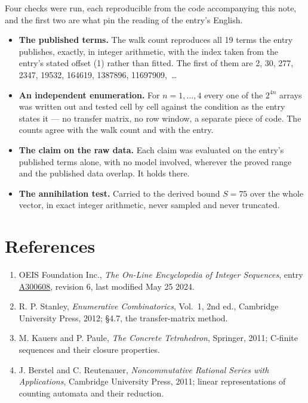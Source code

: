 \documentclass[11pt]{article}
\theoremstyle{definition}
\begin{document}
Four checks were run, each reproducible from the code accompanying this note, and the first two are what pin the reading of the entry's English.

\begin{itemize}

\item {\bfseries The published terms.} The walk count reproduces all 19 terms the entry publishes, exactly, in integer arithmetic, with the index taken from the entry's stated offset (1) rather than fitted. The first of them are 2, 30, 277, 2347, 19532, 164619, 1387896, 11697909,~\dots

\item {\bfseries An independent enumeration.} For $n = 1,\dots,4$ every one of the $2^{4n}$ arrays was written out and tested cell by cell against the condition as the entry states it --- no transfer matrix, no row window, a separate piece of code. The counts agree with the walk count and with the entry.

\item {\bfseries The claim on the raw data.} Each claim was evaluated on the entry's published terms alone, with no model involved, wherever the proved range and the published data overlap. It holds there.

\item {\bfseries The annihilation test.} Carried to the derived bound $S = 75$ over the whole vector, in exact integer arithmetic, never sampled and never truncated.

\end{itemize}

\section{References}

\begin{enumerate}

\item OEIS Foundation Inc., \emph{The On-Line Encyclopedia of Integer Sequences}, entry \href{https://oeis.org/A300608}{A300608}, revision 6, last modified May 25 2024.

\item R. P. Stanley, \emph{Enumerative Combinatorics}, Vol.~1, 2nd ed., Cambridge University Press, 2012; \S4.7, the transfer-matrix method.

\item M. Kauers and P. Paule, \emph{The Concrete Tetrahedron}, Springer, 2011; C-finite sequences and their closure properties.

\item J. Berstel and C. Reutenauer, \emph{Noncommutative Rational Series with Applications}, Cambridge University Press, 2011; linear representations of counting automata and their reduction.

\end{enumerate}
\end{document}
